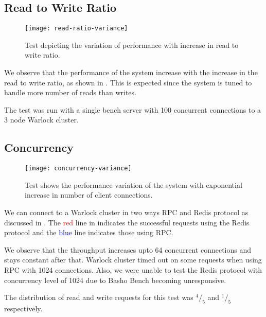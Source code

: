 \subsection{Read to Write Ratio}

\begin{figure}
  \begin{whole}
    \texttt{[image: read-ratio-variance]}
    \caption[Read to Write Ratio Test]{%
      Test depicting the variation of performance with increase in read
      to write ratio.
    }
    \label{figure:res.read.write.ratio}
  \end{whole}
\end{figure}

We observe that the performance of the system increase with the increase in
the read to write ratio, as shown in . This is
expected since the system is tuned to handle more number of reads than writes.

The test was run with a single bench server with 100 concurrent connections to
a 3 node Warlock cluster.

\subsection{Concurrency}

\begin{figure}
  \begin{whole}
    \texttt{[image: concurrency-variance]}
    \caption[Concurrency Test]{%
      Test shows the performance variation of the system with exponential
      increase in number of client connections.
    }
    \label{figure:res.concurrency}
  \end{whole}
\end{figure}

We can connect to a Warlock cluster in two ways \dash{} RPC and Redis protocol
as discussed in . The \textcolor{red}{red} line
in  indicates the successful requests using the
Redis protocol and the \textcolor{blue}{blue} line indicates those using RPC.

We observe that the throughput increases upto 64 concurrent connections and
stays constant after that. Warlock cluster timed out on some requests when
using RPC with 1024 connections. Also, we were unable to test the Redis protocol
with concurrency level of 1024 due to Basho Bench becoming unresponsive.

The distribution of read and write requests for this test was ${}^4/_5$ and
${}^1/_5$ respectively.

